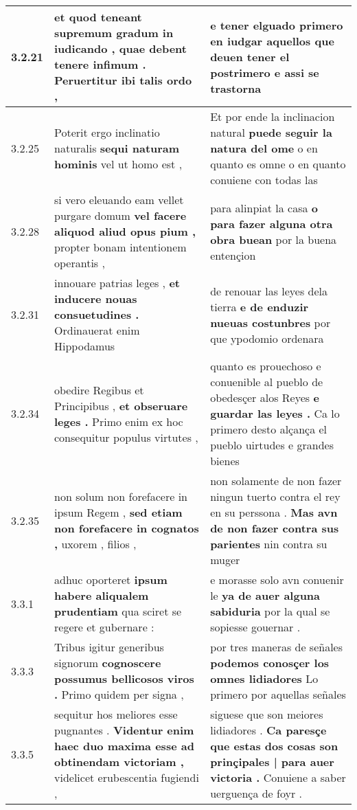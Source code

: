 \begin{tabular}{|p{1cm}|p{6.5cm}|p{6.5cm}|}
3.2.21 & et quod teneant supremum gradum in iudicando , \textbf{ quae debent tenere infimum . } Peruertitur ibi talis ordo , & e tener elguado primero en iudgar \textbf{ aquellos que deuen tener el postrimero } e assi se trastorna \\\hline
3.2.25 & Poterit ergo inclinatio naturalis \textbf{ sequi naturam hominis } vel ut homo est , & Et por ende la inclinacion natural \textbf{ puede seguir la natura del ome } o en quanto es omne o en quanto conuiene con todas las \\\hline
3.2.28 & si vero eleuando eam vellet purgare domum \textbf{ vel facere aliquod aliud opus pium , } propter bonam intentionem operantis , & para alinpiat la casa \textbf{ o para fazer alguna otra obra buean } por la buena entençion \\\hline
3.2.31 & innouare patrias leges , \textbf{ et inducere nouas consuetudines . } Ordinauerat enim Hippodamus & de renouar las leyes dela tierra \textbf{ e de enduzir nueuas costunbres } por que ypodomio ordenara \\\hline
3.2.34 & obedire Regibus et Principibus , \textbf{ et obseruare leges . } Primo enim ex hoc consequitur populus virtutes , & quanto es prouechoso e conuenible al pueblo de obedesçer alos Reyes \textbf{ e guardar las leyes . } Ca lo primero desto alçança el pueblo uirtudes e grandes bienes \\\hline
3.2.35 & non solum non forefacere in ipsum Regem , \textbf{ sed etiam non forefacere in cognatos , } uxorem , filios , & non solamente de non fazer ningun tuerto contra el rey en su perssona . \textbf{ Mas avn de non fazer contra sus parientes } nin contra su muger \\\hline
3.3.1 & adhuc oporteret \textbf{ ipsum habere aliqualem prudentiam } qua sciret se regere et gubernare : & e morasse solo avn conuenir le \textbf{ ya de auer alguna sabiduria } por la qual se sopiesse gouernar . \\\hline
3.3.3 & Tribus igitur generibus signorum \textbf{ cognoscere possumus bellicosos viros . } Primo quidem per signa , & por tres maneras de señales \textbf{ podemos conosçer los omnes lidiadores } Lo primero por aquellas señales \\\hline
3.3.5 & sequitur hos meliores esse pugnantes . \textbf{ Videntur enim haec duo maxima esse ad obtinendam victoriam , } videlicet erubescentia fugiendi , & siguese que son meiores lidiadores . \textbf{ Ca paresçe que estas dos cosas son prinçipales | para auer victoria . } Conuiene a saber uerguença de foyr . \\\hline

\end{tabular}
